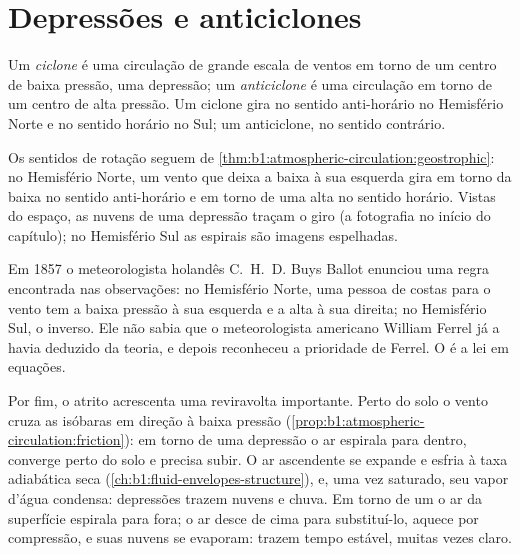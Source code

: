 \section{Depressões e anticiclones}\label{sec:b1:atmospheric-circulation:cyclones}

\begin{definition}\label{def:b1:atmospheric-circulation:cyclone}
Um \emph{ciclone} é uma circulação de grande escala de ventos em torno de um centro de
baixa pressão, uma depressão; um \emph{anticiclone} é uma circulação em torno de
um centro de alta pressão. Um ciclone gira no sentido anti-horário no Hemisfério Norte e no sentido
horário no Sul; um anticiclone, no sentido contrário.
\end{definition}

Os sentidos de rotação seguem de \cref{thm:b1:atmospheric-circulation:geostrophic}: no Hemisfério
Norte, um vento que deixa a baixa à sua esquerda gira em torno da baixa no sentido anti-horário e em
torno de uma alta no sentido horário. Vistas do espaço, as nuvens de uma depressão traçam o giro (a
fotografia no início do capítulo); no Hemisfério Sul as espirais são imagens espelhadas.

\begin{history}
Em 1857 o meteorologista holandês C.~H.~D. Buys Ballot enunciou uma regra encontrada nas
observações: no Hemisfério Norte, uma pessoa de costas para o vento tem a baixa pressão à sua
esquerda e a alta à sua direita; no Hemisfério Sul, o inverso. Ele não sabia que o meteorologista
americano William Ferrel já a havia deduzido da teoria, e depois reconheceu a prioridade de Ferrel.
O  é a lei em equações.
\end{history}

Por fim, o atrito acrescenta uma reviravolta importante. Perto do solo o vento cruza as isóbaras em
direção à baixa pressão (\cref{prop:b1:atmospheric-circulation:friction}): em torno de uma depressão
o ar espirala para dentro, converge perto do solo e precisa subir. O ar ascendente se expande e
esfria à taxa adiabática seca (\cref{ch:b1:fluid-envelopes-structure}), e, uma vez saturado, seu
vapor d'água condensa: depressões trazem nuvens e chuva. Em torno de um  o ar da superfície
espirala para fora; o ar desce de cima para substituí-lo, aquece por compressão, e suas nuvens se
evaporam:  trazem tempo estável, muitas vezes claro.

